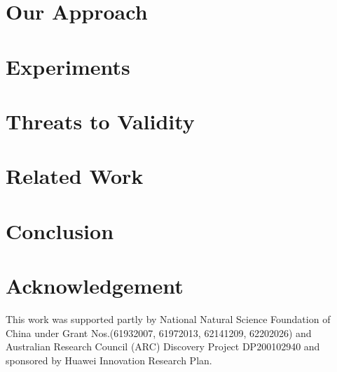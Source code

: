 \documentclass[conference]{IEEEtran}
\begin{document}
\section{Our Approach}
\label{sec:approach}


\section{Experiments}
\label{sec:exp}


\section{Threats to Validity}
\label{sec:threats}


\section{Related Work}
\label{sec:related}


\section{Conclusion}
\label{sec:conclusion}


\section*{Acknowledgement}
This work was supported partly by National Natural Science Foundation of China under Grant Nos.(61932007, 61972013, 62141209, 62202026) and Australian Research Council (ARC) Discovery Project DP200102940 and sponsored by Huawei Innovation Research Plan.


\balance



\end{document}
